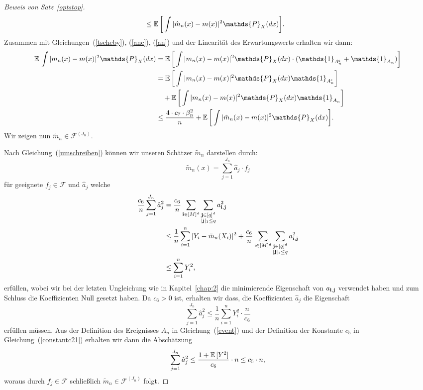 \begin{proof}[Beweis von Satz~\ref{optstop}]
\begin{equation}
\begin{split}
& \leq \E \bigg[\int |\hat{m}_n(x) - m(x)|^2 \mathds{P}_X(dx)\bigg].
\end{split}
\end{equation}
Zusammen mit Gleichungen~(\ref{tscheby}), (\ref{anc}), (\ref{an}) und der Linearität des Erwartungswerts erhalten wir dann:
\begin{equation}
\label{originaleq}
\begin{split}
\E \int |m_n(x) - m(x)|^2 \mathds{P}_X(dx) & = \E \bigg[\int |m_n(x) - m(x)|^2 \mathds{P}_X(dx) \cdot (\mathds{1}_{A_n^{\mathsf{c}}} + \mathds{1}_{A_n})\bigg] \\
& = \E \bigg[\int |m_n(x) - m(x)|^2 \mathds{P}_X(dx) \mathds{1}_{A_n^{\mathsf{c}}}\bigg] \\
& \quad + \E \bigg[\int |m_n(x) - m(x)|^2 \mathds{P}_X(dx) \mathds{1}_{A_n}\bigg] \\
& \leq \frac{4 \cdot c_7 \cdot \beta_n^2}{n} + \E \bigg[\int |\hat{m}_n(x) - m(x)|^2 \mathds{P}_X(dx)\bigg].
\end{split}
\end{equation}
Wir zeigen nun $\tilde{m}_n \in \mathcal{F}^{(J_n)}$.

Nach Gleichung~(\ref{umschreiben}) können wir unseren Schätzer $\tilde{m}_n$ darstellen durch:
$$\tilde{m}_n(x) = \sum_{j = 1}^{J_n}\hat{a}_j \cdot f_j$$
für geeignete $f_j \in \mathcal{F}$ und $\hat{a}_j$ welche 
\begin{equation*}
\begin{split}
\frac{c_6}{n}\sum_{j = 1}^{J_n} \hat{a}_j^2 & = \frac{c_6}{n} \sum_{\mathbf{i} \in [M]^d} \sum_{\substack{\mathbf{j} \in [q]^d \\ |\mathbf{j}|_1 \leq q}} a_{\mathbf{i},\mathbf{j}}^2 \\
& \leq \frac{1}{n} \sum_{i = 1}^n|Y_i - \tilde{m}_n(X_i)|^2 + \frac{c_6}{n} \sum_{\mathbf{i} \in [M]^d} \sum_{\substack{\mathbf{j} \in [q]^d \\ |\mathbf{j}|_1 \leq q}} a_{\mathbf{i},\mathbf{j}}^2 \\
& \leq \sum_{i = 1}^n Y_i^2,
\end{split}
\end{equation*}
erfüllen, wobei wir bei der letzten Ungleichung wie in Kapitel~\ref{chap:2} die minimierende Eigenschaft von $a_{\mathbf{i},\mathbf{j}}$ verwendet haben und zum Schluss die Koeffizienten Null gesetzt haben. Da $c_6 > 0$ ist, erhalten wir dass, die Koeffizienten $\hat{a}_j$ die Eigenschaft
$$\sum_{j = 1}^{J_n} \hat{a}_j^2  \leq \frac{1}{n}\sum_{i = 1}^n Y_i^2 \cdot \frac{n}{c_6}$$
erfüllen müssen.
Aus der Definition des Ereignisses $A_n$ in Gleichung~(\ref{event}) und der Definition der Konstante $c_5$ in Gleichung~(\ref{constantc21}) erhalten wir dann die Abschätzung
$$\sum_{j = 1}^{J_n}\hat{a}_j^2 \leq \frac{1 + \mathbb{E}\,[Y^2]}{c_6} \cdot n \leq c_5 \cdot n,$$
woraus durch $f_j \in \mathcal{F}$ schließlich $\tilde{m}_n \in \mathcal{F}^{(J_n)}$ folgt.


\end{proof}
